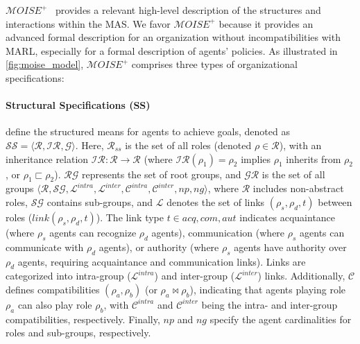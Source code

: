 \documentclass[sigconf,anonymous]{aamas}
\begin{document}
$\mathcal{M}OISE^+$~\citep{Hubner2007} provides a relevant high-level description of the structures and interactions within the MAS. We favor $\mathcal{M}OISE^+$ because it provides an advanced formal description for an organization without incompatibilities with MARL, especially for a formal description of agents' policies.
As illustrated in \ref{fig:moise_model}, $\mathcal{M}OISE^+$ comprises three types of organizational specifications:

\noindent \paragraph{\textbf{Structural Specifications (SS)}} define the structured means for agents to achieve goals, denoted as $\mathcal{SS} = \langle \mathcal{R}, \mathcal{IR}, \mathcal{G} \rangle$. Here, $\mathcal{R}_{ss}$ is the set of all roles (denoted $\rho \in \mathcal{R}$), with an inheritance relation $\mathcal{IR}: \mathcal{R} \rightarrow \mathcal{R}$ (where $\mathcal{IR}(\rho_1) = \rho_2$ implies $\rho_1$ inherits from $\rho_2$, or $\rho_1 \sqsubset \rho_2$). $\mathcal{RG}$ represents the set of root groups, and $\mathcal{GR}$ is the set of all groups $\langle \mathcal{R}, \mathcal{SG}, \mathcal{L}^{intra}, \mathcal{L}^{inter}, \mathcal{C}^{intra}, \mathcal{C}^{inter}, np, ng \rangle$, where $\mathcal{R}$ includes non-abstract roles, $\mathcal{SG}$ contains sub-groups, and $\mathcal{L}$ denotes the set of links $(\rho_s,\rho_d,t)$ between roles ($link(\rho_s,\rho_d,t)$). The link type $t \in {acq, com, aut}$ indicates acquaintance (where $\rho_s$ agents can recognize $\rho_d$ agents), communication (where $\rho_s$ agents can communicate with $\rho_d$ agents), or authority (where $\rho_s$ agents have authority over $\rho_d$ agents, requiring acquaintance and communication links). Links are categorized into intra-group ($\mathcal{L}^{intra}$) and inter-group ($\mathcal{L}^{inter}$) links. Additionally, $\mathcal{C}$ defines compatibilities $(\rho_a, \rho_b)$ (or $\rho_a \bowtie \rho_b$), indicating that agents playing role $\rho_a$ can also play role $\rho_b$, with $\mathcal{C}^{intra}$ and $\mathcal{C}^{inter}$ being the intra- and inter-group compatibilities, respectively. Finally, $np$ and $ng$ specify the agent cardinalities for roles and sub-groups, respectively.
\end{document}
